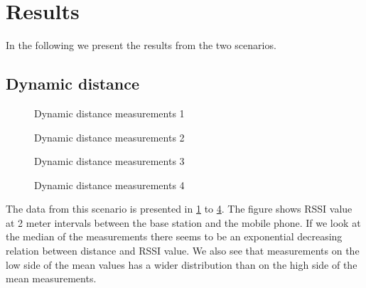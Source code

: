 \section{Results}
\label{sec_results}

In the following we present the results from the two scenarios.

\subsection{Dynamic distance}

\begin{figure}		
	
	
	
	\caption{ Dynamic distance measurements 1 }
	\label{graf_hopper1}
	
\end{figure}

\begin{figure}		
	
	
	
	\caption{ Dynamic distance measurements 2 }
	\label{graf_hopper2}
	
\end{figure}

\begin{figure}		
	
	
	
	\caption{ Dynamic distance measurements 3 }
	\label{graf_hopper3}
	
\end{figure}

\begin{figure}		
	
	
	
	\caption{ Dynamic distance measurements 4 }
	\label{graf_hopper4}
	
\end{figure}

%	
%	
%	
%	

The data from this scenario is presented in \cref{graf_hopper1} to \cref{graf_hopper4}.
The figure shows RSSI value at 2 meter intervals between the base station and the mobile phone.
If we look at the median of the measurements there seems to be an exponential decreasing relation between distance and RSSI value.
We also see that measurements on the low side of the mean values has a wider distribution than on the high side of the mean measurements.

